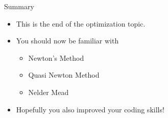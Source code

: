 \documentclass[10pt]{beamer}
\begin{document}
                                                                                                   \begin{frame}{Summary}
                                                                                                     \begin{itemize}
                                                                                                     \item This is the end of the optimization topic.
                                                                                                     \item You should now be familiar with
                                                                                                       \begin{itemize}
                                                                                                       \item Newton's Method
                                                                                                       \item Quasi Newton Method
                                                                                                       \item Nelder Mead
                                                                                                       \end{itemize}
                                                                                                     \item Hopefully you also improved your coding skills!
                                                                                                     \end{itemize}
                                                                                                   \end{frame}
\end{document}
